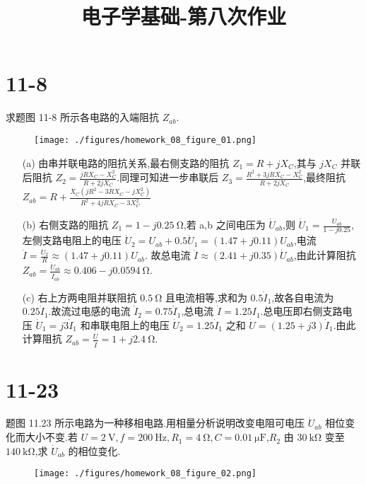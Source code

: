 
\usepackage{../../homeworks_preamble}
\title{电子学基础-第八次作业}


    \maketitle
    \section{11-8} 求题图 11-8 所示各电路的入端阻抗 $Z_{ab}$.
    \begin{figure}[htbp]
        \texttt{[image: ./figures/homework\_08\_figure\_01.png]}
    \end{figure}
    \begin{enumerate}
        \item[(a)] 由串并联电路的阻抗关系,最右侧支路的阻抗 $Z_1=R+jX_{C}$,其与 $jX_{C}$ 并联后阻抗 $Z_2=\frac{jRX_{C}-X_{C}^2}{R+2jX_{C}}$.同理可知进一步串联后 $Z_3=\frac{R^2+3jRX_{C}-X_{C}^2}{R+2jX_{C}}$,最终阻抗 $Z_{ab}=R + \frac{X_{C} \left(j R^{2} - 3 R X_{C} - j X_{C}^{2}\right)}{R^{2} + 4 j R X_{C} - 3 X_{C}^{2}}$
        \item [(b)] 右侧支路的阻抗 $Z_1=1-j0.25 \ \mathrm{\Omega}$,若 a,b 之间电压为 $\dot{U}_{ab}$,则 $\dot{U}_{1}=\frac{\dot{U}_{ab}}{1-j0.25}$,左侧支路电阻上的电压 $\dot{U}_{2}=U_{ab}+0.5\dot{U}_{1}=(1.47 + j0.11)U_{ab}$,电流 $\dot{I}=\frac{\dot{U}_{2}}{R}\approx (1.47 + j0.11)U_{ab}$. 故总电流 $\dot{I}\approx (2.41 + j0.35)\dot{U}_{ab}$,由此计算阻抗 $Z_{ab}=\frac{\dot{U}_{ab}}{\dot{I}_{ab}}\approx 0.406 - j0.0594 \ \mathrm{\Omega}$.
        \item [(c)] 右上方两电阻并联阻抗 $0.5 \ \mathrm{\Omega}$ 且电流相等,求和为 $0.5\dot{I}_1$,故各自电流为 $0.25 \dot{I}_1$.故流过电感的电流 $\dot{I}_2=0.75 \dot{I}_1$,总电流 $\dot{I}=1.25I_1$.总电压即右侧支路电压 $\dot{U}_1=j 3 \dot{I}_{1}$ 和串联电阻上的电压 $\dot{U}_{2}=1.25 \dot{I}_{1}$ 之和 $\dot{U}=(1.25+j 3)\dot{I}_{1}$.由此计算阻抗 $Z_{ab}=\frac{\dot{U}}{\dot{I}}=1+j 2.4 \ \mathrm{\Omega}$.
    \end{enumerate}
    \section{11-23} 题图 11.23 所示电路为一种移相电路.用相量分析说明改变电阻可电压 $\dot{U}_{ab}$ 相位变化而大小不变.若 $U=2 \ \mathrm{V},f=200 \ \mathrm{Hz},R_1=4 \ \mathrm{\Omega}, C=0.01 \ \mathrm{\mu F}$,$R_2$ 由 $30 \ \mathrm{k\Omega}$ 变至 $140 \ \mathrm{k \Omega}$,求 $\dot{U}_{ab}$ 的相位变化.
    \begin{figure}[htbp]
        \texttt{[image: ./figures/homework\_08\_figure\_02.png]}
    \end{figure}


